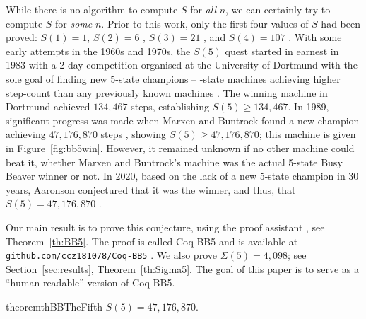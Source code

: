 \documentclass[letterpaper,british,11pt]{article}
\theoremstyle{definition} %
\numberwithin{equation}{section}
\theoremstyle{definition} %
\newcommand{\BBtheFifth}{47{,}176{,}870}
\newcommand{\SigmaTheFifth}{4{,}098}
\newcommand{\CoqBB}{Coq-BB5\xspace}
\begin{document}
While there is no algorithm to compute $S$ for \textit{all} $n$, we can certainly try to compute $S$ for \textit{some} $n$. Prior to this work, only the first four values of $S$ had been proved: $S(1)=1$, $S(2)=6$ \cite{Rado_1962}, $S(3) = 21$ \cite{Lin1963}, and $S(4) = 107$ \cite{Brady83}. With some early attempts in the 1960s and 1970s, the $S(5)$ quest started in earnest in 1983 with a 2-day competition organised at the University of Dortmund with the sole goal of finding new 5-state champions -- -state machines achieving higher step-count than any previously known machines \cite{PMichel_website,michel2019busy}. The winning machine in Dortmund achieved $134{,}467$ steps, establishing $S(5) \geq 134{,}467$. In 1989, significant progress was made when Marxen and Buntrock found a new champion achieving $\BBtheFifth$ steps \cite{Marxen_1990}, showing $S(5) \geq \BBtheFifth$; this machine is given in Figure~\ref{fig:bb5win}. However, it remained unknown if no other machine could beat it, \ie whether Marxen and Buntrock's machine was the actual 5-state Busy Beaver winner or not. In 2020, based on the lack of a new 5-state champion in 30 years, Aaronson conjectured that it was the winner, and thus, that $S(5) = \BBtheFifth$ \cite{BusyBeaverFrontier}.

Our main result is to prove this conjecture, using the \Coq proof assistant \cite{the_coq_development_team_2024_14542673}, see Theorem~\ref{th:BB5}. The \Coq proof is called \CoqBB and is available at \href{https://github.com/ccz181078/Coq-BB5}{\texttt{github.com/ccz181078/Coq-BB5}} \cite{mxdys_2025_17061968}. We also prove $\Sigma(5) = \SigmaTheFifth$; see Section~\ref{sec:results}, Theorem~\ref{th:Sigma5}. The goal of this paper is to serve as a ``human readable'' version of \CoqBB.

\begin{restatable}[\CoqBB: \texttt{Lemma BB5\_value}]{theorem}{thBBTheFifth}\label{th:BB5}
    $S(5) = \BBtheFifth$.
\end{restatable}
\end{document}
